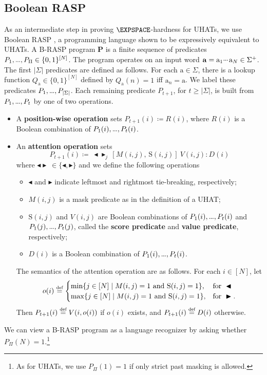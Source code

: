 \documentclass{article} %
\newcommand{\minatt}{\blacktriangleleft}
\newcommand{\maxatt}{\blacktriangleright}
\newcommand{\minmaxatt}{\minatt\!\maxatt}
\newcommand{\score}{\mathrm{S}}
\newcommand{\defeq}{\mathrel{\stackrel{\textnormal{\tiny def}}{=}}}
\newcommand{\defn}[1]{\textbf{#1}}
\newcommand{\bnfdef}{\coloneqq}
\newcommand{\sym}[1]{\mathrm{#1}}
\newcommand{\str}[1]{#1}
\newcommand{\alphabet}{\Sigma}
\newcommand{\bword}{\mathbf{a}}
\newcommand{\brasp}{\boldsymbol{P}}
\newcommand{\Qprop}[1]{Q_{#1}}
\newcommand{\kplus}{^+}
\newcommand{\mydots}{%
  \ifmmode
    \mathord{.}\mkern-1mu\mathord{.}\mkern-1mu\mathord{.}%
  \else
    .\kern-0.1em.\kern-0.1em.%
  \fi
}
\newcommand{\mycdots}{%
  \ifmmode
    \mathord{\raisebox{0.45ex}{\ensuremath{\mydots}}}\mkern2mu%
  \else
    \raisebox{0.45ex}{.\kern-0.1em.\kern-0.1em.}\kern0.1em%
  \fi
}
\renewcommand{\cdots}{\mycdots}%
\renewcommand{\ldots}{\mydots}%
\renewcommand{\dots}{\mydots}%
\begin{document}
\subsection{Boolean RASP}
As an intermediate step in proving $\EXPSPACE$-hardness for UHATs, we use
Boolean RASP \citep[\mbox{B-RASP};][]{YangCA24}, a programming language
shown to be expressively equivalent to UHATs.
A B-RASP program $\brasp$ is a finite sequence of predicates $P_1, \ldots, P_\Pi \in \{0,1\}^{[N]}$.
The program operates
on an input word $\str{\bword} = \sym{a}_1 \cdots \sym{a}_N \in \alphabet\kplus$.
The first $|\alphabet|$ predicates are defined as follows.
For each $\sym{a} \in \alphabet$, there is a lookup function $\Qprop{\sym{a}}
\in \{0,1\}^{[N]}$ defined by $\Qprop{\sym{a}}(n) = 1$ iff $\sym{a}_n = \sym{a}$.
We label these predicates
$P_1, \ldots, P_{|\alphabet|}$. Each remaining predicate $P_{t+1}$, for $t \ge |\alphabet|$, is built from $P_1, \ldots, P_t$ by one of two operations.
\begin{itemize}[itemsep=1pt, topsep=2pt, parsep=0pt, leftmargin=2em]
\item A \defn{position-wise operation} sets $P_{t+1}(i) \bnfdef R(i)$, where $R(i)$ is
a Boolean combination of $P_1(i), \dots, P_t(i)$.
\item An \defn{attention operation} sets
\begin{equation}
    P_{t+1}(i) \bnfdef\ \minmaxatt_j\, [M(i,j),\, \score(i,j)]\ V(i,j) : D(i)
\end{equation}
where $\minmaxatt\ \in \{\minatt,\maxatt\}$ and we define the following operations
\begin{itemize}[itemsep=1pt, topsep=2pt, parsep=0pt, leftmargin=2em]
    \item $\minatt$ and $\maxatt$ indicate leftmost and
    rightmost tie-breaking, respectively; 
    \item $M(i,j)$ is a mask predicate as in the definition of a
    UHAT; 
    \item $\score(i,j)$ and $V(i,j)$ are Boolean combinations of $P_1(i),
    \ldots, P_t(i)$ and $P_1(j), \ldots, P_t(j)$, called the
    \defn{score predicate} and \defn{value predicate}, respectively;
    \item $D(i)$ is a Boolean combination of $P_1(i), \dots, P_t(i)$.
\end{itemize}
    The semantics of the attention operation are as follows. For each $i \in [N]$, let
\begin{equation}
    o(i) \defeq \begin{cases}
        \min\{j \in [N] \mid M(i,j) = 1 \text{ and } \score(i,j) = 1\},
            & \text{for } \minatt \\
        \max\{j \in [N] \mid M(i,j) = 1 \text{ and } \score(i,j) = 1\},
            & \text{for } \maxatt.
    \end{cases}
\end{equation}
Then $P_{t+1}(i) \defeq V(i, o(i))$ if $o(i)$ exists, and $P_{t+1}(i) \defeq
D(i)$ otherwise.
\end{itemize}
We can view a B-RASP program as a language recognizer by asking whether $P_\Pi(N) = 1$.\footnote{As for UHATs, we use $P_\Pi(1) = 1$ if only strict past masking is allowed.}
\end{document}

